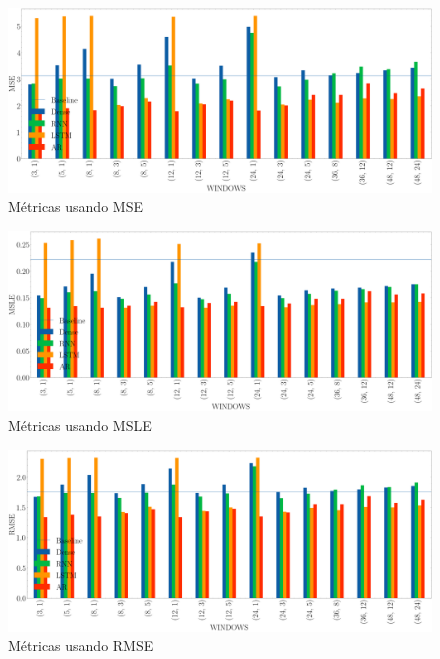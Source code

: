 \begin{figure}[H]
    \centering
    \includegraphics[width=15cm]{images/solution/metrics/MSE.png}
    \caption{Métricas usando MSE}
\end{figure}

\begin{figure}[H]
    \centering
    \includegraphics[width=15cm]{images/solution/metrics/MSLE.png}
    \caption{Métricas usando MSLE}
\end{figure}

\begin{figure}[H]
    \centering
    \includegraphics[width=15cm]{images/solution/metrics/RMSE.png}
    \caption{Métricas usando RMSE}
\end{figure}

\begin{figure}[H]
    \centering
\end{figure}